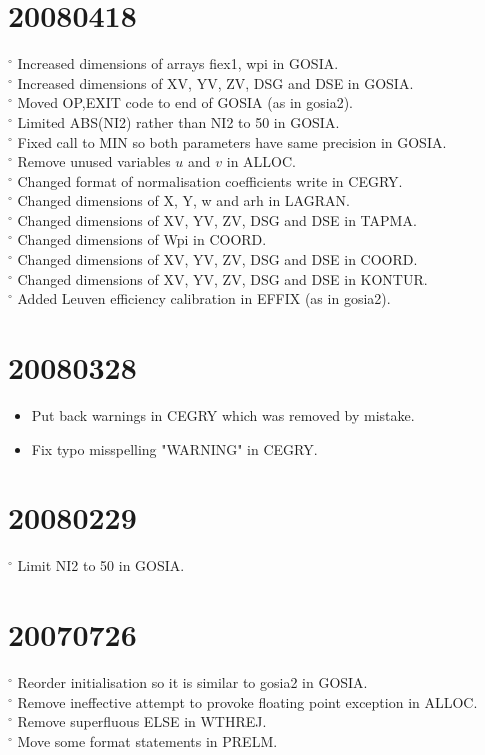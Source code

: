\documentclass[10pt]{article}
\begin{document}
\section*{20080418}
${ }^{\circ}$ Increased dimensions of arrays fiex1, wpi in GOSIA.\\
${ }^{\circ}$ Increased dimensions of XV, YV, ZV, DSG and DSE in GOSIA.\\
${ }^{\circ}$ Moved OP,EXIT code to end of GOSIA (as in gosia2).\\
${ }^{\circ}$ Limited ABS(NI2) rather than NI2 to 50 in GOSIA.\\
${ }^{\circ}$ Fixed call to MIN so both parameters have same precision in GOSIA.\\
${ }^{\circ}$ Remove unused variables $u$ and $v$ in ALLOC.\\
${ }^{\circ}$ Changed format of normalisation coefficients write in CEGRY.\\
${ }^{\circ}$ Changed dimensions of X, Y, w and arh in LAGRAN.\\
${ }^{\circ}$ Changed dimensions of XV, YV, ZV, DSG and DSE in TAPMA.\\
${ }^{\circ}$ Changed dimensions of Wpi in COORD.\\
${ }^{\circ}$ Changed dimensions of XV, YV, ZV, DSG and DSE in COORD.\\
${ }^{\circ}$ Changed dimensions of XV, YV, ZV, DSG and DSE in KONTUR.\\
${ }^{\circ}$ Added Leuven efficiency calibration in EFFIX (as in gosia2).

\section*{20080328}
\begin{itemize}
  \item Put back warnings in CEGRY which was removed by mistake.
  \item Fix typo misspelling "WARNING" in CEGRY.
\end{itemize}

\section*{20080229}
${ }^{\circ}$ Limit NI2 to 50 in GOSIA.

\section*{20070726}
${ }^{\circ}$ Reorder initialisation so it is similar to gosia2 in GOSIA.\\
${ }^{\circ}$ Remove ineffective attempt to provoke floating point exception in ALLOC.\\
${ }^{\circ}$ Remove superfluous ELSE in WTHREJ.\\
${ }^{\circ}$ Move some format statements in PRELM.
\end{document}
